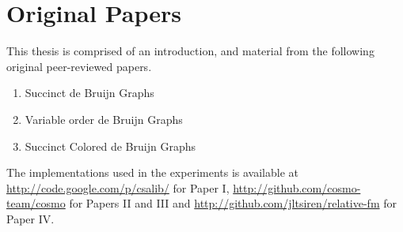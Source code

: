 \chapter*{Original Papers}

This thesis is comprised of an introduction,
and material from the following original peer-reviewed papers.

\begin{enumerate}
\item Succinct de Bruijn Graphs
\item Variable order de Bruijn Graphs
\item Succinct Colored de Bruijn Graphs
\end{enumerate}

The implementations used in the experiments is available at 
\url{http://code.google.com/p/csalib/} for Paper I, %
\url{http://github.com/cosmo-team/cosmo} for Papers II and III
and \url{http://github.com/jltsiren/relative-fm} for Paper IV.
